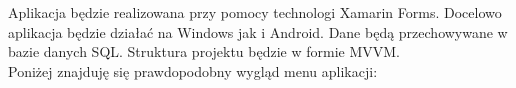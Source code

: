 \documentclass[8pt]{article}
\begin{document}
Aplikacja będzie realizowana przy pomocy technologi Xamarin Forms. Docelowo aplikacja będzie działać na Windows jak i Android. Dane będą przechowywane w bazie danych SQL. Struktura projektu będzie w formie MVVM.\\
Poniżej znajduję się prawdopodobny wygląd menu aplikacji:\\
\begin{center}
\end{center}
\end{document}
